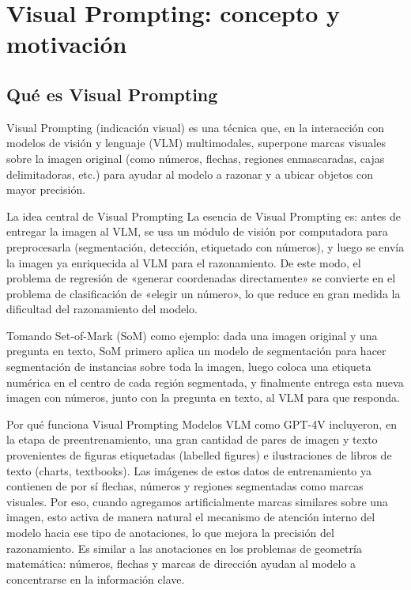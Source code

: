 \section{Visual Prompting: concepto y motivación}

\subsection{Qué es Visual Prompting}

Visual Prompting (indicación visual) es una técnica que, en la interacción con modelos de visión y lenguaje (VLM) multimodales, superpone marcas visuales sobre la imagen original (como números, flechas, regiones enmascaradas, cajas delimitadoras, etc.) para ayudar al modelo a razonar y a ubicar objetos con mayor precisión.

\begin{importantbox}{La idea central de Visual Prompting}
La esencia de Visual Prompting es: antes de entregar la imagen al VLM, se usa un módulo de visión por computadora para preprocesarla (segmentación, detección, etiquetado con números), y luego se envía la imagen ya enriquecida al VLM para el razonamiento. De este modo, el problema de regresión de «generar coordenadas directamente» se convierte en el problema de clasificación de «elegir un número», lo que reduce en gran medida la dificultad del razonamiento del modelo.
\end{importantbox}

Tomando Set-of-Mark (SoM) como ejemplo: dada una imagen original y una pregunta en texto, SoM primero aplica un modelo de segmentación para hacer segmentación de instancias sobre toda la imagen, luego coloca una etiqueta numérica en el centro de cada región segmentada, y finalmente entrega esta nueva imagen con números, junto con la pregunta en texto, al VLM para que responda.

\begin{knowledgebox}{Por qué funciona Visual Prompting}
Modelos VLM como GPT-4V incluyeron, en la etapa de preentrenamiento, una gran cantidad de pares de imagen y texto provenientes de figuras etiquetadas (labelled figures) e ilustraciones de libros de texto (charts, textbooks). Las imágenes de estos datos de entrenamiento ya contienen de por sí flechas, números y regiones segmentadas como marcas visuales. Por eso, cuando agregamos artificialmente marcas similares sobre una imagen, esto activa de manera natural el mecanismo de atención interno del modelo hacia ese tipo de anotaciones, lo que mejora la precisión del razonamiento. Es similar a las anotaciones en los problemas de geometría matemática: números, flechas y marcas de dirección ayudan al modelo a concentrarse en la información clave.
\end{knowledgebox}

